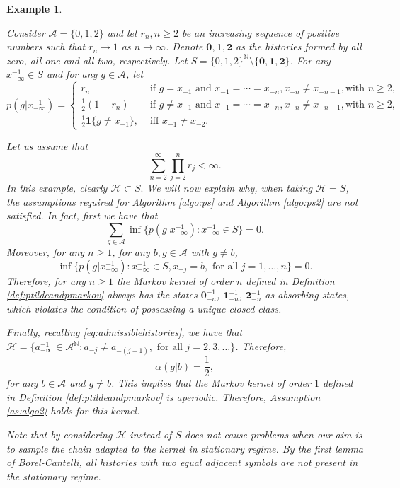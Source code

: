 \documentclass[a4paper]{article}
\newtheorem{example}[theorem]{Example}
\newcommand{\N}{\mathbb{N}}
\renewcommand{\H}{\mathcal{H}}
\newcommand{\A}{\mathcal{A}}
\begin{document}

\begin{example} \label{ex:admissiblehistories}

Consider $\A=\{0,1,2\}$ and let $r_n, n\geq 2$  be an increasing sequence of positive numbers such that $r_n\to 1$ as $n\to \infty$. Denote $\mathbf{0,1,2} $ as the histories formed by all zero, all one and all two, respectively. Let $S= \{0,1,2\}^\N \setminus \{ \mathbf {0,1,2} \}$.
For any $x_{-\infty}^{-1}\in S$ and for any $g\in \A$, let
\begin{equation}
    p (g | x^{-1}_{-\infty})=
\begin{cases}
r_n &\text{ if } g=x_{-1} \text{ and } x_{-1} = \cdots = x_{-n} , x_{-n}\neq x_{-n -1},\text{with } n \geq 2, \\
\frac{1}{2}(1-r_n)  &\text{ if } g \neq x_{-1} \text{ and } x_{-1} = \cdots = x_{-n} , x_{-n}\neq x_{-n -1},\text{with } n \geq 2, \\
\frac{1}{2}\mathbf{1}\{g \neq x_{-1}\}, &\text{ iff } x_{-1}\neq x_{-2}.
\end{cases} \label{esempio}
\end{equation}

Let us assume that
$$
\sum_{n=2}^{\infty}\prod_{j=2}^nr_j<\infty.
$$
In this example, clearly $\H \subset S.$ We will now explain why, when taking $\H = S$, 
the assumptions required for Algorithm \ref{algo:ps} and  Algorithm \ref{algo:ps2} are not satisfied. In fact, first we have that 
$$
\sum_{g\in \A}\inf\{p(g|x_{-\infty}^{-1}):x_{-\infty}^{-1}\in S\}=0.
$$
Moreover, for any $n\geq 1$, for any $b,g\in \A$ with $g\neq b$,
$$
\inf\{p(g|x_{-\infty}^{-1}):x_{-\infty}^{-1}\in S, x_{-j}=b, \text{ for all } j=1,\ldots,n\} =0.
$$
Therefore, for any $n \geq 1$ the Markov kernel of order $n$
defined in Definition \ref{def:ptildeandpmarkov}  always has the states $\mathbf{0}^{-1}_{-n}$, $\mathbf{1}^{-1}_{-n}$, $\mathbf{2}^{-1}_{-n}$ as absorbing states, which violates the condition of possessing a unique closed class. %

Finally, recalling \eqref{eq:admissiblehistories}, we have that $\H=\{a_{-\infty}^{-1}\in \A^{\N}:a_{-j} \neq a_{-(j-1)}, \text{ for all } j= 2,3,\ldots\}$. Therefore,
$$
\alpha(g|b)=\frac{1}{2},
$$
for any $b\in \A$ and $g\neq b$. This implies that the Markov kernel of order $1$ defined in Definition \ref{def:ptildeandpmarkov} is aperiodic. Therefore, Assumption \ref{as:algo2} holds for this kernel.

Note that by considering $\H$ instead of $S$ does not cause problems when our aim is to sample the chain adapted to the kernel in stationary regime. By the first lemma of Borel-Cantelli, all histories with two equal adjacent symbols are not present in the stationary regime.
\end{example}
\end{document}
